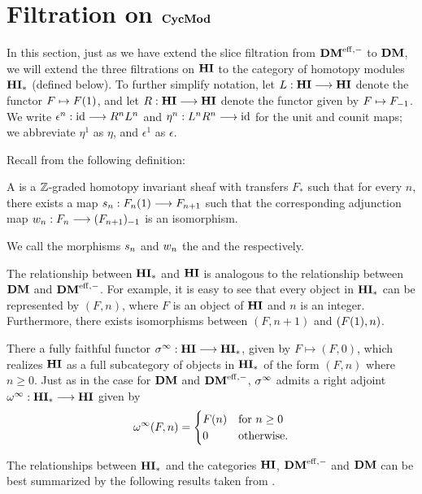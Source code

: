 \newpage
\chapter{Filtration on $\CycMod$}\label{sect_filtration_cycmod}

In this section, just as we have extend the slice filtration from
$\DMeff$ to $\DM$, we will extend the three filtrations on
$\HI$ to the category of homotopy modules $\HM$ (defined below).
To further simplify notation, let $L: \HI \to \HI$ denote the 
functor $F \mapsto \LHI{F}$, and let $R: \HI \to \HI$ denote the 
functor given by $F \mapsto \RHI{F}$. We write $\epsilon^n : \id 
\to R^nL^n$ and $\eta^n: L^nR^n \to \id$ for the unit and counit 
maps; we abbreviate $\eta^1$ as $\eta$, and $\epsilon^1$ as 
$\epsilon$.

Recall from \cite[1.17]{DegModHom} the following definition:

\begin{defn}\label{def_hm}
A  is a $\Z$-graded homotopy 
invariant sheaf with transfers $F_*$ such that for every $n$, 
there exists a map $\susp_n: \LHI{F_n} \to F_{n+1}$ such that the 
corresponding adjunction map $\deloop_n: F_n \to \RHI{(F_{n+1})}$
is an isomorphism.

We call the morphisms $\susp_n$ and $\deloop_n$ the  and the  respectively.
\end{defn}

The relationship between $\HM$ and $\HI$ is analogous to the 
relationship between $\DM$ and $\DMeff$. For example, it is easy 
to see that every object in $\HM$ can be represented by $(F, n)$, 
where $F$ is an object of $\HI$ and $n$ is an integer. 
Furthermore, there exists isomorphisms between $(F, n + 1)$ and
$(\LHI{F}, n)$. 

There a fully faithful functor $\spectHI : \HI \to \HM$, given by 
$F \mapsto (F, 0)$, which realizes $\HI$ as a full subcategory of 
objects in $\HM$ of the form $(F, n)$ where $n \geq 0$. Just as in
the case for $\DM$ and $\DMeff$, $\spectHI$ admits a right adjoint
$\loopHM : \HM \to \HI$ given by 
\[
\loopHM(F, n) = \begin{cases}
\LHI[n]F &\textrm{for }n \geq 0\\
0 &\textrm{otherwise}.
\end{cases}
\]

The relationships between $\HM$ and the categories $\HI$, $\DMeff$ 
and $\DM$ can be best summarized by the following results taken
from \cite{DegModHom}.

